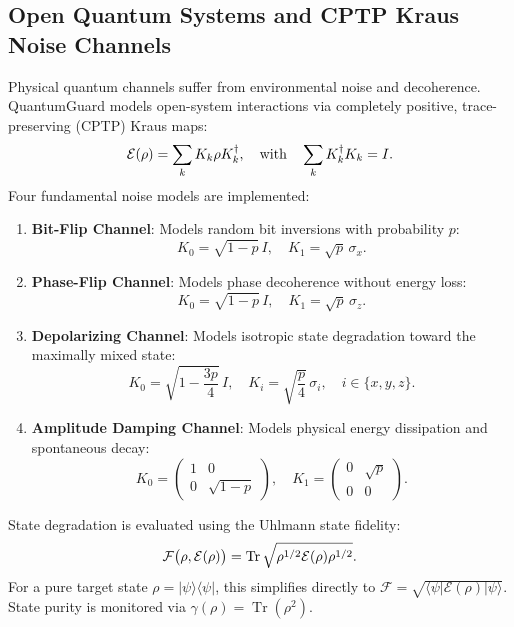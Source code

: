 \documentclass[journal,10pt]{IEEEtran}
\makeatletter
\let\orig@label\label
\def\label#1{%
  \orig@label{#1}%
  \pdfdest name{ref.#1} fith\relax
}
\makeatother
\begin{document}
\subsection{Open Quantum Systems and CPTP Kraus Noise Channels}
Physical quantum channels suffer from environmental noise and decoherence. QuantumGuard models open-system interactions via completely positive, trace-preserving (CPTP) Kraus maps:
\begin{equation}
  \mathcal{E}(\rho) = \sum_{k} K_k \rho K_k^\dagger, \quad \text{with} \quad \sum_k K_k^\dagger K_k = I.
  \label{eq:kraus_rep}
\end{equation}
Four fundamental noise models are implemented:
\begin{enumerate}
    \item \textbf{Bit-Flip Channel}: Models random bit inversions with probability $p$:
    \begin{equation}
      K_0 = \sqrt{1-p}\,I, \quad K_1 = \sqrt{p}\,\sigma_x.
    \end{equation}
    \item \textbf{Phase-Flip Channel}: Models phase decoherence without energy loss:
    \begin{equation}
      K_0 = \sqrt{1-p}\,I, \quad K_1 = \sqrt{p}\,\sigma_z.
    \end{equation}
    \item \textbf{Depolarizing Channel}: Models isotropic state degradation toward the maximally mixed state:
    \begin{equation}
      K_0 = \sqrt{1 - \frac{3p}{4}}\,I, \quad K_i = \sqrt{\frac{p}{4}}\,\sigma_i, \quad i \in \{x, y, z\}.
    \end{equation}
    \item \textbf{Amplitude Damping Channel}: Models physical energy dissipation and spontaneous decay:
    \begin{equation}
      K_0 = \begin{pmatrix} 1 & 0 \\ 0 & \sqrt{1-p} \end{pmatrix}, \quad K_1 = \begin{pmatrix} 0 & \sqrt{p} \\ 0 & 0 \end{pmatrix}.
    \end{equation}
\end{enumerate}
State degradation is evaluated using the Uhlmann state fidelity:
\begin{equation}
  \mathcal{F}\bigl(\rho, \mathcal{E}(\rho)\bigr) = \operatorname{Tr}\sqrt{\rho^{1/2} \mathcal{E}(\rho) \rho^{1/2}}.
  \label{eq:uhlmann}
\end{equation}
For a pure target state $\rho = |\psi\rangle\langle\psi|$, this simplifies directly to $\mathcal{F} = \sqrt{\langle\psi|\mathcal{E}(\rho)|\psi\rangle}$. State purity is monitored via $\gamma(\rho) = \operatorname{Tr}(\rho^2)$.
\end{document}
